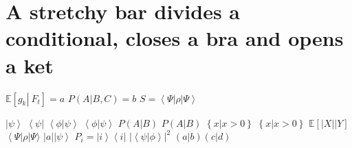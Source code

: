 \documentclass{article}
\begin{document}
\section{A stretchy bar divides a conditional, closes a bra and opens a ket}
$\mathbb{E}\left[\left.g_{k}\right|\ F_{t}\right]=a$ $P\left(\left.A\right|B,C\right)=b$
$S=\left<\Psi\right|\rho\left|\Psi\right>$

$\left|\psi\right\rangle$ $\left\langle\psi\right|$ $\left\langle\phi\right|\left.\psi\right\rangle$
$\left\langle\phi\right.\left|\psi\right\rangle$ $P\left(\left.A\right|B\right)$ $P\left(A\left|B\right.\right)$
$\left\{x\left|x>0\right.\right\}$ $\left\{x\right|\left.x>0\right\}$ $\mathbb{E}\left[\left.\left|X\right|\right|Y\right]$
$\left\langle\Psi\right|\rho|\Psi\rangle$ $\left|a\right|\left|\psi\right\rangle$ $P_{i}=\left|i\right\rangle\left\langle i\right|$
$\left|\left\langle\psi\right|\left.\phi\right\rangle\right|^{2}$ $\left(\left.a\right|b\right)\left(\left.c\right|d\right)$
\end{document}
